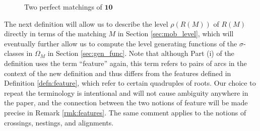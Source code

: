\documentclass[10pt,a4paper]{amsart}
\numberwithin{equation}{section}
\newcommand{\ten}{\mathbf{10}}
\newcommand{\mob}{\Omega_M}
\begin{document}
\begin{figure}[h!]
  \centering
\quad
{}
\caption{Two perfect matchings of $\ten$}
\label{fig:matchings}
\end{figure}

The next definition will allow us to describe the level $\rho(R(M))$ of $R(M)$
directly in terms of the matching $M$ in Section \ref{sec:mob_level}, which will
eventually further allow us to compute the level generating functions of the
$\sigma$-classes in $\mob$ in Section \ref{sec:gen_func}. Note that although
Part (i) of the definition uses the term ``feature'' again, this term refers to
pairs of arcs in the context of the new definition and thus differs from the
features defined in Definition \ref{defn:feature}, which refer to certain
quadruples of roots. Our choice to repeat the terminology is intentional and
will not cause ambiguity anywhere in the paper, and the connection between the
two notions of feature will be made precise in Remark \ref{rmk:features}. The
same comment applies to the notions of crossings, nestings, and alignments.
\end{document}
